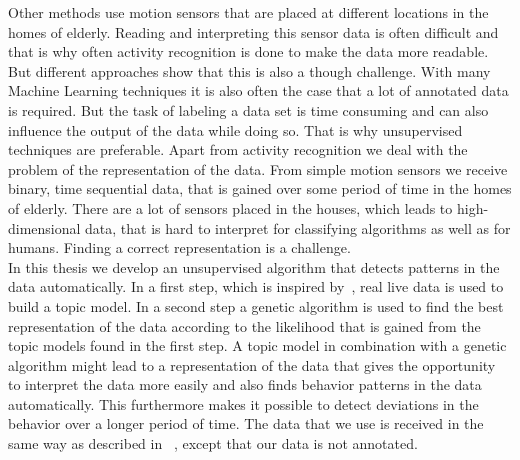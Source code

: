 \documentclass[11pt,a4paper]{article}
\begin{document}
Other methods use motion sensors that are placed at different locations in the homes of elderly. %
Reading and interpreting this sensor data is often difficult and that is why often activity recognition is done to make the data more readable. But different approaches show that this is also a though challenge.
With many Machine Learning techniques it is also often the case that a lot of annotated data is required.  But the task of labeling a data set is time consuming and can also influence the output of the data while doing so. That is why unsupervised techniques are preferable. Apart from activity recognition we deal with the problem of the representation of the data. From simple motion sensors we receive binary, time sequential data, that is gained over some period of time in the homes of elderly. There are a lot of sensors placed in the houses, which leads to high-dimensional data, that is hard to interpret for classifying algorithms as well as for humans. Finding a correct representation is a challenge.\\

In this thesis we develop an unsupervised algorithm that detects patterns in the data automatically.
In a first step, which is inspired by~\cite{farrahi2008daily}, real live data is used to build a topic model. In a second step a genetic algorithm is used to find the best representation of the data according to the likelihood that is gained from the topic models found in the first step. 
 A topic model in combination with a genetic algorithm might lead to a representation of the data that gives the opportunity to interpret the data more easily and also finds behavior patterns in the data automatically. This furthermore makes it possible to detect deviations in the behavior over a longer period of time. The data that we use is received in the same way as described in ~\cite{van2010activity}, except that our data is not annotated.\\
\end{document}
